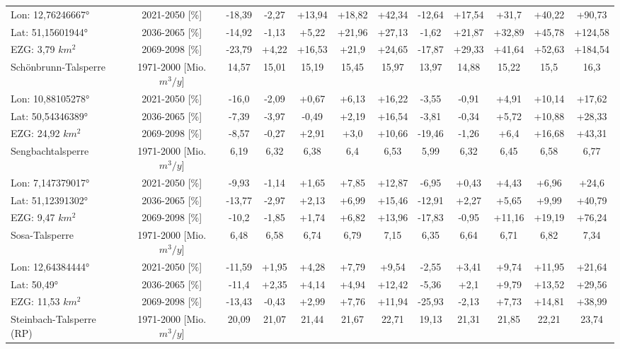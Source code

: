 \begin{longtable}{@{\extracolsep{\fill}}lc|ccccc||ccccc}
\cline{2-12} 
Lon: 12,76246667° & 2021-2050 [\%]  & -18,39 & -2,27 & +13,94 & +18,82 & +42,34 & -12,64 & +17,54 & +31,7 & +40,22 & +90,73\\ 
Lat: 51,15601944° & 2036-2065 [\%]  & -14,92 & -1,13 & +5,22 & +21,96 & +27,13 & -1,62 & +21,87 & +32,89 & +45,78 & +124,58\\ 
EZG: 3,79 $km^2$ & 2069-2098 [\%]  & -23,79 & +4,22 & +16,53 & +21,9 & +24,65 & -17,87 & +29,33 & +41,64 & +52,63 & +184,54\\ 
\hline 
Schönbrunn-Talsperre & 1971-2000 [Mio. $m^3/y$]  & 14,57 & 15,01 & 15,19 & 15,45 & 15,97 & 13,97 & 14,88 & 15,22 & 15,5 & 16,3\\ 
\cline{2-12} 
Lon: 10,88105278° & 2021-2050 [\%]  & -16,0 & -2,09 & +0,67 & +6,13 & +16,22 & -3,55 & -0,91 & +4,91 & +10,14 & +17,62\\ 
Lat: 50,54346389° & 2036-2065 [\%]  & -7,39 & -3,97 & -0,49 & +2,19 & +16,54 & -3,81 & -0,34 & +5,72 & +10,88 & +28,33\\ 
EZG: 24,92 $km^2$ & 2069-2098 [\%]  & -8,57 & -0,27 & +2,91 & +3,0 & +10,66 & -19,46 & -1,26 & +6,4 & +16,68 & +43,31\\ 
\hline 
Sengbachtalsperre & 1971-2000 [Mio. $m^3/y$]  & 6,19 & 6,32 & 6,38 & 6,4 & 6,53 & 5,99 & 6,32 & 6,45 & 6,58 & 6,77\\ 
\cline{2-12} 
Lon: 7,147379017° & 2021-2050 [\%]  & -9,93 & -1,14 & +1,65 & +7,85 & +12,87 & -6,95 & +0,43 & +4,43 & +6,96 & +24,6\\ 
Lat: 51,12391302° & 2036-2065 [\%]  & -13,77 & -2,97 & +2,13 & +6,99 & +15,46 & -12,91 & +2,27 & +5,65 & +9,99 & +40,79\\ 
EZG: 9,47 $km^2$ & 2069-2098 [\%]  & -10,2 & -1,85 & +1,74 & +6,82 & +13,96 & -17,83 & -0,95 & +11,16 & +19,19 & +76,24\\ 
\hline 
Sosa-Talsperre & 1971-2000 [Mio. $m^3/y$]  & 6,48 & 6,58 & 6,74 & 6,79 & 7,15 & 6,35 & 6,64 & 6,71 & 6,82 & 7,34\\ 
\cline{2-12} 
Lon: 12,64384444° & 2021-2050 [\%]  & -11,59 & +1,95 & +4,28 & +7,79 & +9,54 & -2,55 & +3,41 & +9,74 & +11,95 & +21,64\\ 
Lat: 50,49° & 2036-2065 [\%]  & -11,4 & +2,35 & +4,14 & +4,94 & +12,42 & -5,36 & +2,1 & +9,79 & +13,52 & +29,56\\ 
EZG: 11,53 $km^2$ & 2069-2098 [\%]  & -13,43 & -0,43 & +2,99 & +7,76 & +11,94 & -25,93 & -2,13 & +7,73 & +14,81 & +38,99\\ 
\hline 
Steinbach-Talsperre (RP) & 1971-2000 [Mio. $m^3/y$]  & 20,09 & 21,07 & 21,44 & 21,67 & 22,71 & 19,13 & 21,31 & 21,85 & 22,21 & 23,74\\ 

\end{longtable}
